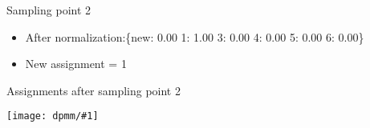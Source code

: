 \documentclass[compress]{beamer}
\newcommand{\gfx}[2]{
\begin{center}
	\texttt{[image: dpmm/\#1]}
\end{center}
}
\begin{document}
\begin{frame}{Sampling point 2}
\begin{itemize}
\begin{tiny}
\begin{align}
{p(z_{2} = 5\,|\, \vec{z_{-2}}, \vec{x}, \alpha) & \propto \frac{1.00}{6 + 0.25} \mathcal{N} \left( \begin{array}{c} 7.00 \\ 6.00 \\ \end{array} \, \g \, \begin{array}{c} -3.50 \\ -3.50 \\ \end{array}, \mathbb{1} \right) = 0.16 \times 0.00000\\
p(z_{2} = 6\,|\, \vec{z_{-2}}, \vec{x}, \alpha) & \propto \frac{1.00}{6 + 0.25} \mathcal{N} \left( \begin{array}{c} 7.00 \\ 6.00 \\ \end{array} \, \g \, \begin{array}{c} 0.50 \\ 0.50 \\ \end{array}, \mathbb{1} \right) = 0.16 \times 0.00020}
\end{align}\end{tiny}
\pause
\item<4-> After normalization:\{new: 0.00	1: 1.00	3: 0.00	4: 0.00	5: 0.00
  6: 0.00\}\pause
\item<5-> New assignment = 1
\end{itemize}
\end{frame}



\begin{frame}{Assignments after sampling point 2}
    \gfx{dpmm3}{.8}
    \end{frame}
\end{document}
